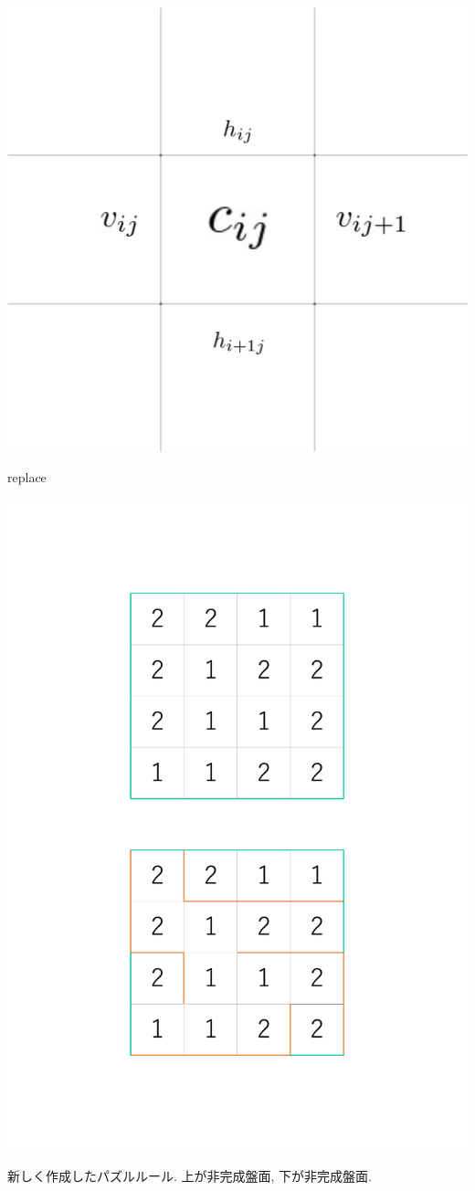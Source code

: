 \begin{clearpagefigure}
  \includegraphics[width=0.85\linewidth,clip]{fig/cycle.png}
  \caption{replace}
  \label{figure:NumberLinkQuestionReplace}
\end{clearpagefigure}

\begin{clearpagefigure}
  \includegraphics[width=0.85\linewidth,clip]{fig/NewPuzzleRule.pdf}
  \caption{新しく作成したパズルルール. 上が非完成盤面, 下が非完成盤面. }
  \label{figure:NewPuzzleRule}
\end{clearpagefigure}
